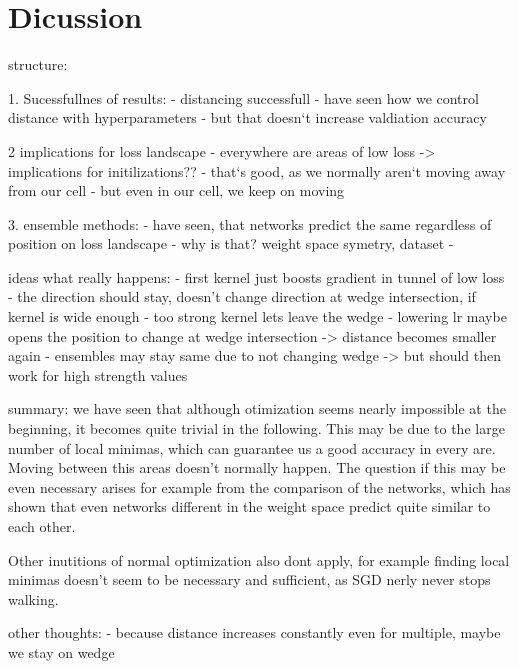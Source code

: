 \chapter{Dicussion}

structure:

1. Sucessfullnes of results:
- distancing successfull
- have seen how we control distance with hyperparameters
- but that doesn`t increase valdiation accuracy

2 implications for loss landscape
- everywhere are areas of low loss -> implications for initilizations??
- that`s good, as we normally aren`t moving away from our cell
- but even in our cell, we keep on moving


3. ensemble methods:
- have seen, that networks predict the same regardless of position on loss landscape
- why is that? weight space symetry, dataset
- 


ideas what really happens:
- first kernel just boosts gradient in tunnel of low loss
- the direction should stay, doesn't change direction at wedge intersection, if kernel is wide enough
- too strong kernel lets leave the wedge
- lowering lr maybe opens the position to change at wedge intersection -> distance becomes smaller again
- ensembles may stay same due to not changing wedge -> but should then work for high strength values




summary: we have seen that although otimization seems nearly impossible at the
beginning, it becomes quite trivial in the following. This may be due to the
large number of local minimas, which can guarantee us a good accuracy in every
are. Moving between this areas doesn't normally happen. The question if this may
be even necessary arises for example from the comparison of the networks, which
has shown that even networks different in the weight space predict quite similar
to each other.

Other inutitions of normal optimization also dont apply, for
example finding local minimas doesn't seem to be necessary and sufficient, as
SGD nerly never stops walking.


other thoughts:
- because distance increases constantly even for multiple, maybe we stay on wedge